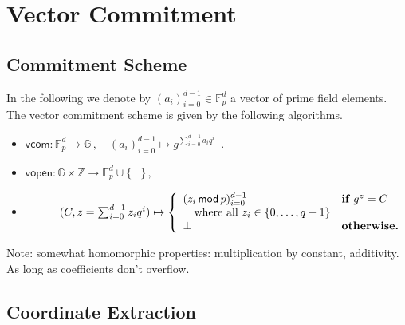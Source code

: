 \documentclass{article}
\theoremstyle{definition}
\begin{document}
\section{Vector Commitment}


\subsection{Commitment Scheme}

In the following we denote by $(a_i)_{i=0}^{d-1} \in \mathbb{F}_p^{d}$ a vector of prime field elements. The vector commitment scheme is given by the following algorithms.
\begin{itemize}
\item $\mathsf{vcom} : \mathbb{F}_p^d \rightarrow \mathbb{G} \, , \quad (a_i)_{i=0}^{d-1} \mapsto g^{\sum_{i=0}^{d-1} a_iq^i} \enspace .$
\item $\mathsf{vopen} : \mathbb{G} \times \mathbb{Z} \rightarrow \mathbb{F}_p^d \cup \{\bot\} \, , $
\item[] $\phantom{\mathsf{vopen} :} (C, z = \sum_{i=0}^{d-1} z_iq^i) \mapsto \left\lbrace \begin{array}{ll}
(z_i \, \mathsf{mod} \, p)_{i=0}^{d-1} & \textnormal{\bf if } g^z = C \\
\quad \textnormal{where all } z_i \in \{0,\ldots,q-1\} & \\
\bot & \textnormal{\bf otherwise.}
\end{array} \right.$ 
\end{itemize}

Note: somewhat homomorphic properties: multiplication by constant, additivity. As long as coefficients don't overflow.

\subsection{Coordinate Extraction}
\end{document}
